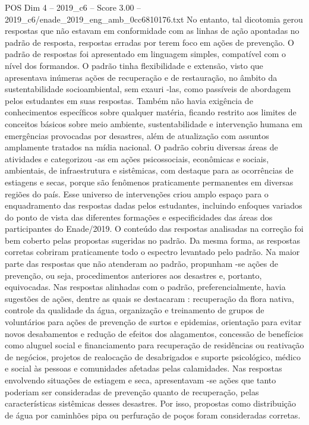 \begin{textsample}{POS Dim 4 – 2019\_c6 – Score 3.00 – 2019\_c6/enade\_2019\_eng\_amb\_0cc6810176.txt}
No entanto, tal dicotomia gerou respostas que não estavam em conformidade com as linhas de ação apontadas no padrão de resposta, respostas erradas por terem foco em ações de prevenção.
O padrão de respostas foi apresentado em linguagem simples, compatível com o nível dos formandos.
O padrão tinha flexibilidade e extensão, visto que apresentava inúmeras ações de recuperação e de restauração, no âmbito da sustentabilidade socioambiental, sem exauri -las, como passíveis de abordagem pelos estudantes em suas respostas.
Também não havia exigência de conhecimentos específicos sobre qualquer matéria, ficando restrito aos limites de conceitos básicos sobre meio ambiente, sustentabilidade e intervenção humana em emergências provocadas por desastres, além de atualização com assuntos amplamente tratados na mídia nacional.
O padrão cobriu diversas áreas de atividades e categorizou -as em ações psicossociais, econômicas e sociais, ambientais, de infraestrutura e sistêmicas, com destaque para as ocorrências de estiagens e secas, porque são fenômenos praticamente permanentes em diversas regiões do país.
Esse universo de intervenções criou amplo espaço para o enquadramento das respostas dadas pelos estudantes, incluindo enfoques variados do ponto de vista das diferentes formações e especificidades das áreas dos participantes do Enade/2019.
O conteúdo das respostas analisadas na correção foi bem coberto pelas propostas sugeridas no padrão.
Da mesma forma, as respostas corretas cobriram praticamente todo o espectro levantado pelo padrão.
Na maior parte das respostas que não atenderam ao padrão, propunham -se ações de prevenção, ou seja, procedimentos anteriores aos desastres e, portanto, equivocadas.
Nas respostas alinhadas com o padrão, preferencialmente, havia sugestões de ações, dentre as quais se destacaram : recuperação da flora nativa, controle da qualidade da água, organização e treinamento de grupos de voluntários para ações de prevenção de surtos e epidemias, orientação para evitar novos desabamentos e redução de efeitos dos alagamentos, concessão de benefícios como aluguel social e financiamento para recuperação de residências ou reativação de negócios, projetos de realocação de desabrigados e suporte psicológico, médico e social às pessoas e comunidades afetadas pelas calamidades.
Nas respostas envolvendo situações de estiagem e seca, apresentavam -se ações que tanto poderiam ser consideradas de prevenção quanto de recuperação, pelas características sistêmicas desses desastres.
Por isso, propostas como distribuição de água por caminhões pipa ou perfuração de poços foram consideradas corretas.

\end{textsample}
